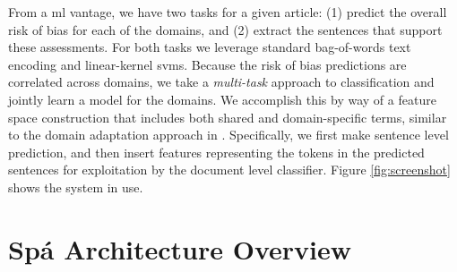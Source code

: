 \documentclass[runningheads,a4paper]{llncs}
\begin{document}
From a \ac{ml} vantage, we have two tasks for a given article: (1) predict the overall risk of bias for each of the domains, and (2) extract the sentences that support these assessments.
For both tasks we leverage standard bag-of-words text encoding and linear-kernel \aclp{svm}.
Because the risk of bias predictions are correlated across domains, we take a \emph{multi-task} \cite{Evgeniou2004} approach to classification and jointly learn a model for the domains.
We accomplish this by way of a feature space construction that includes both shared and domain-specific terms, similar to the domain adaptation approach in \cite{Daume2007}.
Specifically, we first make sentence level prediction, and then insert features representing the tokens in the predicted sentences for exploitation by the document level classifier.
Figure \ref{fig:screenshot} shows the system in use.



\section{Spá Architecture Overview}
\end{document}
